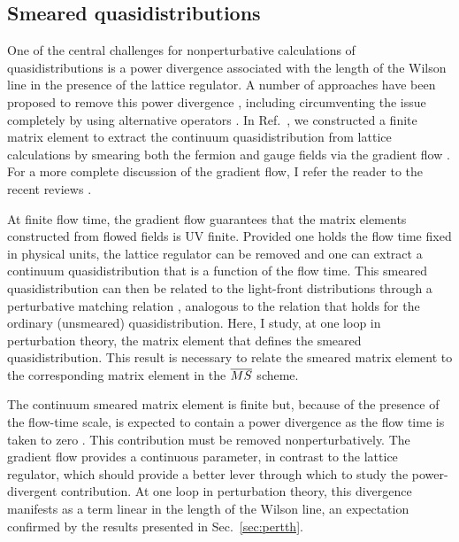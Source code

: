 \subsection{Smeared quasidistributions}

One of the central challenges for nonperturbative calculations of quasidistributions is a power divergence associated with the length of the Wilson line in the presence of the lattice regulator. A number of approaches have been proposed to remove this power divergence \cite{Chen:2016fxx,Ishikawa:2016znu,Chen:2017mzz,Alexandrou:2017huk,Orginos:2017kos}, including circumventing the issue completely by using alternative operators \cite{Aglietti:1998ur,Abada:2001if,Detmold:2005gg,Braun:2007wv,Bali:2017gfr}. In Ref.~\cite{Monahan:2016bvm}, we constructed a finite matrix element to extract the continuum quasidistribution from lattice calculations by smearing both the fermion and gauge fields via the gradient flow
\cite{Narayanan:2006rf,Luscher:2011bx,Luscher:2013cpa}. For a more complete discussion of the gradient flow, I refer the reader to the recent reviews
\cite{Luscher:2013vga,Ramos:2015dla}.

At finite flow time, the gradient flow guarantees that the matrix elements constructed from flowed fields is UV finite. Provided one holds the flow time fixed in physical units, the lattice regulator can be removed and one can extract a continuum quasidistribution that is a function of the flow time. This smeared quasidistribution can then be related to the light-front distributions through a perturbative matching relation \cite{Monahan:2016bvm}, analogous to the relation that holds for the ordinary (unsmeared) quasidistribution. Here, I study, at one loop in perturbation theory, the matrix element that defines the smeared quasidistribution. This result is necessary to relate the smeared matrix element to the corresponding matrix element in the $\overline{MS}$ scheme.

The continuum smeared matrix element is finite but, because of the presence of the flow-time scale, is expected to contain a power divergence as the flow time is taken to zero \cite{Monahan:2016bvm}. This contribution must be removed nonperturbatively. The gradient flow provides a continuous parameter, in contrast to the lattice regulator, which should provide a better lever through which to study the power-divergent contribution. At one loop in perturbation theory, this divergence manifests as a term linear in the length of the Wilson line, an expectation confirmed by the results presented in Sec.~\ref{sec:pertth}.

